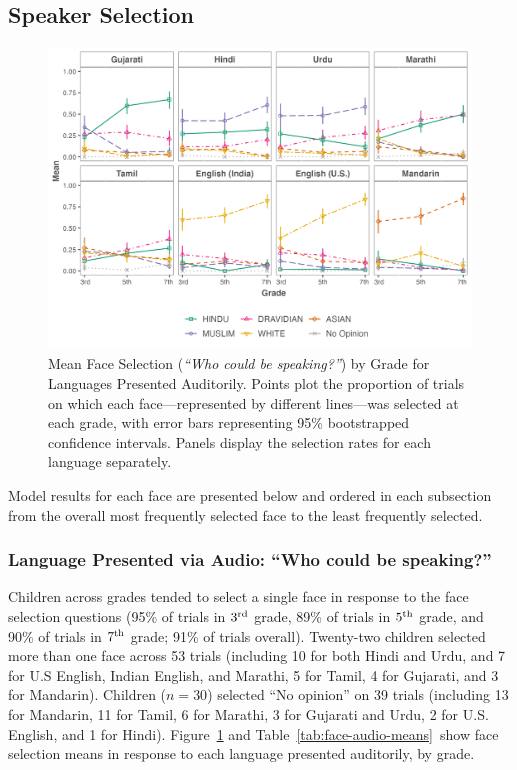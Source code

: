 \documentclass{foushee-adapted-preprint}
\newcommand{\faceaudiomeanstab}{\ref{tab:face-audio-means}}
\begin{document}
\subsection*{Speaker Selection}
\begin{figure}
    \centering
    \includegraphics[width=1.2\linewidth]{figures/std_plots/audio_faces_std.png}
    \caption{Mean Face Selection (\emph{``Who could be speaking?''}) by Grade for Languages Presented Auditorily. Points plot the proportion of trials on which each face---represented by different lines---was selected at each grade, with error bars representing 95\% bootstrapped confidence intervals. Panels display the selection rates for each language separately.}
    \label{fig:faces-language-audio}
\vspace{-7pt}
\end{figure}
Model results for each face are presented below and ordered in each subsection from the overall most frequently selected face to the least frequently selected. 

\subsubsection*{Language Presented via Audio: ``Who could be speaking?''} 
Children across grades tended to select a single face in response to the face selection questions (95\% of trials in $3^{\textnormal{rd}}$ grade, 89\% of trials in $5^{\textnormal{th}}$ grade, and 90\% of trials in $7^{\textnormal{th}}$ grade; 91\% of trials overall).  
Twenty-two children selected more than one face across 53 trials (including 10 for both Hindi and Urdu, and 7 for U.S English, Indian English, and Marathi, 5 for Tamil, 4 for Gujarati, and 3 for Mandarin).
Children ($n=30$) selected ``No opinion'' on 39 trials (including 13 for Mandarin, 11 for Tamil, 6 for Marathi, 3 for Gujarati and Urdu, 2 for U.S. English, and 1 for Hindi).
Figure~\ref{fig:faces-language-audio} and Table~\faceaudiomeanstab\ show face selection means in response to each language presented auditorily, by grade.
\end{document}
